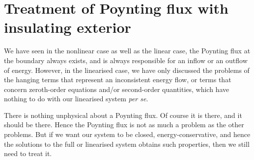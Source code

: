 \section{Treatment of Poynting flux with insulating exterior}

We have seen in the nonlinear case as well as the linear case, the Poynting flux at the boundary always exists, and is always responsible for an inflow or an outflow of energy.
However, in the linearised case, we have only discussed the problems of the hanging terms that represent an inconsistent energy flow, or terms that concern zeroth-order equations and/or second-order quantities, which have nothing to do with our linearised system \textit{per se}.

There is nothing unphysical about a Poynting flux. Of course it is there, and it should be there. Hence the Poynting flux is not as much a problem as the other problems. But if we want our system to be closed, energy-conservative, and hence the solutions to the full or linearised system obtains such properties, then we still need to treat it.

